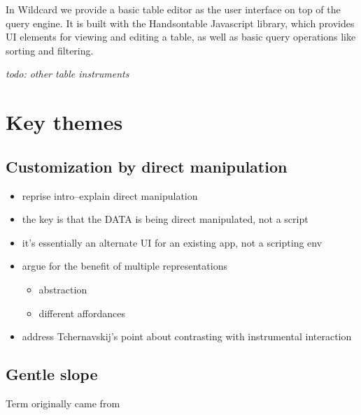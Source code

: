 \documentclass[sigplan,10pt,anonymous,review]{acmart}
\providecommand{\tightlist}{%
  \setlength{\itemsep}{0pt}\setlength{\parskip}{0pt}}
\begin{document}
In Wildcard we provide a basic table editor as the user interface on top
of the query engine. It is built with the Handsontable Javascript
library, which provides UI elements for viewing and editing a table, as
well as basic query operations like sorting and filtering.

\emph{todo: other table instruments}

\hypertarget{sec:themes}{%
\section{Key themes}\label{sec:themes}}

\hypertarget{customization-by-direct-manipulation}{%
\subsection{Customization by direct
manipulation}\label{customization-by-direct-manipulation}}

\begin{itemize}
\tightlist
\item
  reprise intro--explain direct manipulation
\item
  the key is that the DATA is being direct manipulated, not a script
\item
  it's essentially an alternate UI for an existing app, not a scripting
  env
\item
  argue for the benefit of multiple representations
  \citep{ainsworth1999}

  \begin{itemize}
  \tightlist
  \item
    abstraction
  \item
    different affordances
  \end{itemize}
\item
  address Tchernavskij's point about contrasting with instrumental
  interaction
\end{itemize}

\hypertarget{gentle-slope}{%
\subsection{Gentle slope}\label{gentle-slope}}

Term originally came from \citep{maclean1990}
\end{document}

